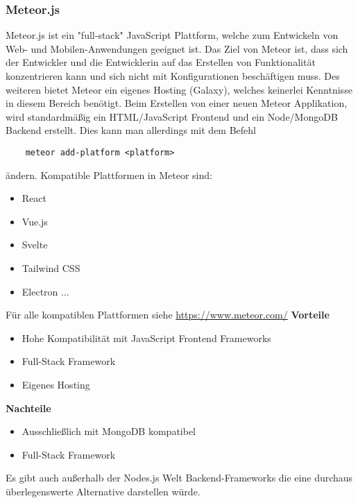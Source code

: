 \subsubsection{Meteor.js}
Meteor.js ist ein "full-stack" JavaScript Plattform, welche zum Entwickeln von Web- und Mobilen-Anwendungen geeignet ist. Das Ziel von Meteor ist, dass sich der Entwickler und die Entwicklerin auf das Erstellen von Funktionalität konzentrieren kann und sich nicht mit Konfigurationen beschäftigen muss. Des weiteren bietet Meteor ein eigenes Hosting (Galaxy), welches keinerlei Kenntnisse in diesem Bereich benötigt. 
\newline
Beim Erstellen von einer neuen Meteor Applikation, wird standardmäßig ein HTML/JavaScript Frontend und ein Node/MongoDB Backend erstellt. Dies kann man allerdings mit dem Befehl
\begin{verbatim}
    meteor add-platform <platform>
\end{verbatim}
ändern. Kompatible Plattformen in Meteor sind:
\begin{itemize}
    \item React
    \item Vue.js
    \item Svelte
    \item Tailwind CSS
    \item Electron ...
\end{itemize}
Für alle kompatiblen Plattformen siehe \url{https://www.meteor.com/}
\newline
\textbf{Vorteile}
\begin{itemize}
    \item Hohe Kompatibilität mit JavaScript Frontend Frameworks
    \item Full-Stack Framework
    \item Eigenes Hosting
\end{itemize}
\textbf{Nachteile}
\begin{itemize}
    \item Ausschließlich mit MongoDB kompatibel
    \item Full-Stack Framework
\end{itemize}
\cite{backend_meteor}
\cite{backend_meteor_1}
\newline
Es gibt auch außerhalb der Nodes.js Welt Backend-Frameworks die eine durchaus überlegenswerte Alternative darstellen würde.

